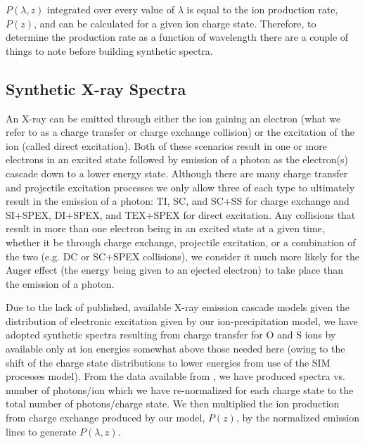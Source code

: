 \documentclass[draft]{agujournal2018}
\begin{document}
$P(\lambda,z)$ integrated over every value of $\lambda$ is equal to the ion production rate, $P(z)$, and can be calculated for a given ion charge state.
Therefore, to determine the production rate as a function of wavelength there are a couple of things to note before building synthetic spectra.

\subsection{Synthetic X-ray Spectra}
\label{sec:SynthXraySpec}

An X-ray can be emitted through either the ion gaining an electron (what we refer to as a charge transfer or charge exchange collision) or the excitation of the ion (called direct excitation).
Both of these scenarios result in one or more electrons in an excited state followed by emission of a photon as the electron(s) cascade down to a lower energy state.
Although there are many charge transfer and projectile excitation processes we only allow three of each type to ultimately result in the emission of a photon: TI, SC, and SC+SS for charge exchange and SI+SPEX, DI+SPEX, and TEX+SPEX for direct excitation.
Any collisions that result in more than one electron being in an excited state at a given time, whether it be through charge exchange, projectile excitation, or a combination of the two (e.g. DC or SC+SPEX collisions), we consider it much more likely for the Auger effect (the energy being given to an ejected electron) to take place than the emission of a photon.

Due to the lack of published, available X-ray emission cascade models given the distribution of electronic excitation given by our ion-precipitation model, we have adopted synthetic spectra resulting from charge transfer for O and S ions by \citet{hui2010} available only at ion energies somewhat above those needed here (owing to the shift of the charge state distributions to lower energies from use of the SIM processes model).
From the data available from \citet{hui2010}, we have produced spectra vs. number of photons/ion which we have re-normalized for each charge state to the total number of photons/charge state.
We then multiplied the ion production from charge exchange produced by our model, $P(z)$, by the normalized emission lines to generate $P(\lambda,z)$.
\end{document}
